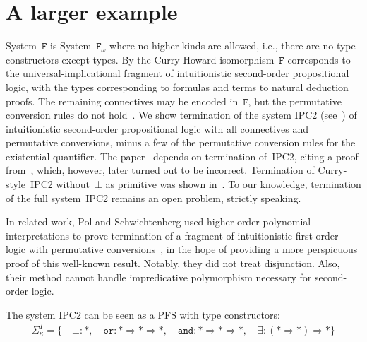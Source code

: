 \documentclass[a4paper,UKenglish,cleveref,autoref,numberwithinsect]{lipics-v2019}
\theoremstyle{definition}
\newcommand{\Fomega}{\mathtt{F}_\omega}
\newcommand{\arrkind}{\Rightarrow}
\begin{document}
\section{A larger example}\label{sec:examples}

System~$\mathtt{F}$ is System~$\Fomega$ where no higher kinds are
allowed, i.e., there are no type constructors except types. By the
Curry-Howard isomorphism~$\mathtt{F}$ corresponds to the
universal-implicational fragment of intuitionistic second-order
propositional logic, with the types corresponding to formulas and
terms to natural deduction proofs. The remaining connectives may be
encoded in~$\mathtt{F}$, but the permutative conversion rules do not
hold~\cite{Girard1989}. We show termination of the system IPC2
(see~\cite{SorensenUrzyczyn2010}) of intuitionistic second-order
propositional logic with all connectives and permutative conversions,
minus a few of the permutative conversion rules for the existential
quantifier. The paper~\cite{SorensenUrzyczyn2010} depends on
termination of~IPC2, citing a proof from~\cite{Wojdyga2008}, which,
however, later turned out to be incorrect. Termination of
Curry-style~IPC2 without~$\bot$ as primitive was shown
in~\cite{Tatsuta2007}. To our knowledge, termination of the full
system~IPC2 remains an open problem, strictly speaking.

In related work, Pol and Schwichtenberg used higher-order polynomial
interpretations to prove termination of a fragment of intuitionistic
first-order logic with permutative
conversions~\cite{PolSchwichtenberg1995}, in the hope of providing a
more perspicuous proof of this well-known result. Notably, they did not
treat disjunction. Also, their method cannot handle impredicative
polymorphism necessary for second-order logic.

The system IPC2 can be seen as a PFS with type constructors:
\[
\begin{array}{c}
\Sigma^T_\kappa = \{\quad
  \bot : *,\quad
  \mathtt{or} : * \arrkind * \arrkind *,\quad
  \mathtt{and} : * \arrkind * \arrkind *,\quad
  \exists : (* \arrkind *) \arrkind *
  \}
\end{array}
\]
\end{document}

